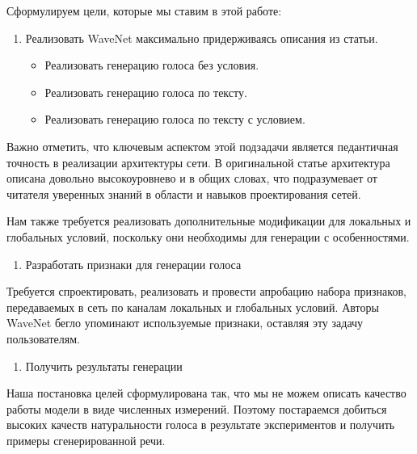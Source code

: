 \documentclass[../diploma.tex]{subfiles}
\begin{document}
Сформулируем цели, которые мы ставим в этой работе:

\begin{enumerate}
    \item Реализовать WaveNet максимально придерживаясь описания из статьи.
    \begin{itemize}
        \item Реализовать генерацию голоса без условия.
        \item Реализовать генерацию голоса по тексту.
        \item Реализовать генерацию голоса по тексту с условием.
    \end{itemize}    
\end{enumerate}

Важно отметить, что ключевым аспектом этой подзадачи является педантичная точность в реализации архитектуры сети.
В оригинальной статье архитектура описана довольно высокоуровнево и в общих словах, что подразумевает от читателя уверенных знаний в области и навыков проектирования сетей.

Нам также требуется реализовать дополнительные модификации для локальных и глобальных условий, поскольку они необходимы для генерации с особенностями.

\begin{enumerate}[resume]
    \item Разработать признаки для генерации голоса
\end{enumerate}

Требуется спроектировать, реализовать и провести апробацию набора признаков, передаваемых в сеть по каналам локальных и глобальных условий. Авторы WaveNet бегло упоминают используемые признаки, оставляя эту задачу пользователям. 

\begin{enumerate}[resume]
    \item Получить результаты генерации
\end{enumerate}

Наша постановка целей сформулирована так, что мы не можем описать качество работы модели в виде численных измерений.
Поэтому постараемся добиться высоких качеств натуральности голоса в результате экспериментов и получить примеры сгенерированной речи.
\end{document}

